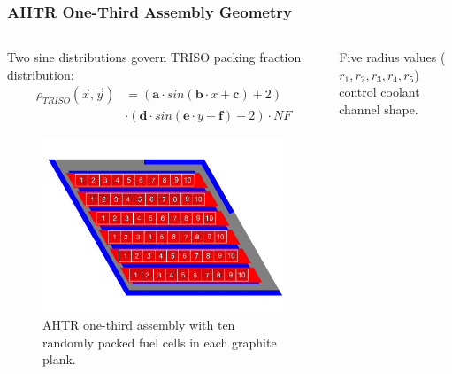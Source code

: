 \begin{frame}
    \frametitle{AHTR One-Third Assembly Geometry}
    \begin{columns}
        \begin{column}{0.5\textwidth}
            Two sine distributions govern TRISO packing fraction distribution:
            \vspace{-0.2cm} 
            \begin{align}
            \rho_{TRISO}(\vec{x}, \vec{y}) &= \left(\textbf{a}\cdot sin(\textbf{b}\cdot 
            x + \textbf{c}) + 2\right) \nonumber \\
            & \cdot \left(\textbf{d}\cdot sin(\textbf{e}\cdot y + \textbf{f}) + 2\right) 
            \cdot NF \nonumber
            \end{align}
            \vspace{-0.7cm}
            \begin{figure}
                \includegraphics[width=\linewidth]{../docs/figures/ahtr_assembly.png} 
                \caption{AHTR one-third assembly with ten randomly packed fuel cells in 
                each graphite plank.}
            \end{figure}
        \end{column}
        \begin{column}{0.5\textwidth} 
            Five radius values (\textbf{$r_1, r_2, r_3, r_4, r_5$}) control coolant channel shape.
            \begin{figure}

\end{figure}
\end{column}
\end{columns}
\end{frame}
